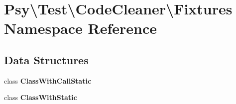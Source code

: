\section{Psy\textbackslash{}Test\textbackslash{}Code\+Cleaner\textbackslash{}Fixtures Namespace Reference}
\label{namespace_psy_1_1_test_1_1_code_cleaner_1_1_fixtures}
\subsection*{Data Structures}
\begin{DoxyCompactItemize}
\item 
class {\bf Class\+With\+Call\+Static}
\item 
class {\bf Class\+With\+Static}
\end{DoxyCompactItemize}

